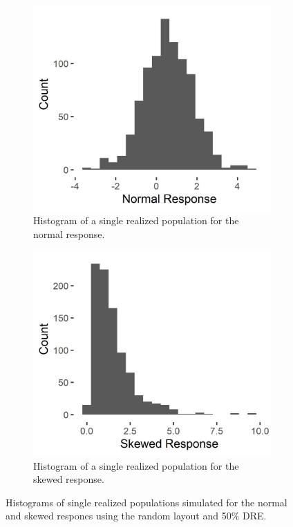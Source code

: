 \documentclass[]{elsarticle} %
\begin{document}
\begin{figure}
\centering
\begin{subfigure}{0.49\textwidth}
  \centering
  \includegraphics[width = 1\linewidth]{figures/symm_pop_hist.jpeg}
  \caption{Histogram of a single realized population for the normal response.}
  \label{fig:symm_pop_hist}
\end{subfigure}
\begin{subfigure}{0.49\textwidth}
  \centering
  \includegraphics[width = 1\linewidth]{figures/skew_pop_hist.jpeg}
  \caption{Histogram of a single realized population for the skewed response.}
  \label{fig:skew_pop_hist}
\end{subfigure}
\caption{Histograms of single realized populations simulated for the normal and skewed respones using the random layout and 50\% DRE.}
\label{fig:sim_pops}
\end{figure}
\end{document}
